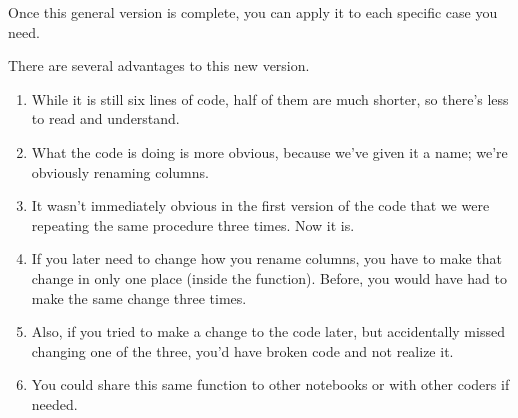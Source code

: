 \documentclass[letterpaper,10pt,english]{sphinxmanual}
\begin{document}
\begin{sphinxVerbatim}[commandchars=\\\{\}]
    
        
      \PYG{p}{[}\PYG{p}{]}  \PYG{p}{[}\PYG{p}{]}
\end{sphinxVerbatim}

Once this general version is complete, you can apply it to each specific case you need.

\begin{sphinxVerbatim}[commandchars=\\\{\}]
  
  
  
\end{sphinxVerbatim}

There are several advantages to this new version.
\begin{enumerate}
%
\item {} 
While it is still six lines of code, half of them are much shorter, so there’s less to read and understand.

\item {} 
What the code is doing is more obvious, because we’ve given it a name; we’re obviously renaming columns.

\item {} 
It wasn’t immediately obvious in the first version of the code that we were repeating the same procedure three times.  Now it is.

\item {} 
If you later need to change how you rename columns, you have to make that change in only one place (inside the function).  Before, you would have had to make the same change three times.

\item {} 
Also, if you tried to make a change to the code later, but accidentally missed changing one of the three, you’d have broken code and not realize it.

\item {} 
You could share this same function to other notebooks or with other coders if needed.

\end{enumerate}
\end{document}
